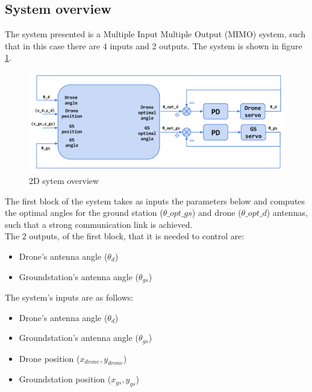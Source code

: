 \subsection{System overview}
The system presented is a Multiple Input Multiple Output (MIMO) system, such that in this case there are 4 inputs and 2 outputs. The system is shown in figure \ref{fig:2d_system}. 

\begin{figure}[h]
	\centering
	\includegraphics[scale=0.42]{figures/2d_system.png}
	\caption{2D sytem overview}
	\label{fig:2d_system}
\end{figure}
The first block of the system takes as inputs the parameters below and computes the optimal angles for the ground station ($\theta\_opt\_gs$) and drone ($\theta\_opt\_d$) antennas, such that a strong communication link is achieved. \\

\noindent The 2 outputs, of the first block, that it is needed to control are:
\begin{itemize}
	\item Drone's antenna angle ($\theta_{d}$)
	\item Groundstation's antenna angle ($\theta_{gs}$)
\end{itemize}

\noindent The system's inputs are as follows:
\begin{itemize}
	\item Drone's antenna angle ($\theta_{d}$)
	\item Groundstation's antenna angle ($\theta_{gs}$)
	\item Drone position ($x_{drone},y_{drone}$)
	\item Groundstation position ($x_{gs},y_{gs}$)
\end{itemize}

